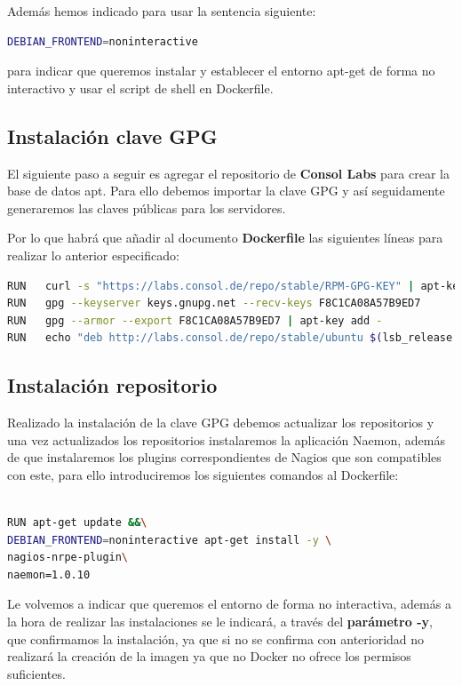 Además hemos indicado para usar la sentencia siguiente:
\begin{lstlisting}[language=bash]
DEBIAN_FRONTEND=noninteractive
\end{lstlisting}
para indicar que queremos instalar y establecer el entorno apt-get de forma no interactivo y usar el script de shell en Dockerfile.
\newpage
\subsection{Instalación clave GPG}
El siguiente paso a seguir es agregar el repositorio de \textbf{Consol Labs} para crear la base de datos apt. Para ello debemos importar la clave GPG y así seguidamente generaremos las claves públicas para los servidores.

Por lo que habrá que añadir al documento \textbf{Dockerfile} las siguientes líneas para realizar lo anterior especificado:

\begin{lstlisting}[language=bash]
RUN   curl -s "https://labs.consol.de/repo/stable/RPM-GPG-KEY" | apt-key add -
RUN   gpg --keyserver keys.gnupg.net --recv-keys F8C1CA08A57B9ED7
RUN   gpg --armor --export F8C1CA08A57B9ED7 | apt-key add -
RUN   echo "deb http://labs.consol.de/repo/stable/ubuntu $(lsb_release -cs) main" > /etc/apt/sources.list.d/labs-consol-stable.list

\end{lstlisting}
\subsection{Instalación repositorio}
Realizado la instalación de la clave GPG debemos actualizar los repositorios y una vez actualizados los repositorios instalaremos la aplicación Naemon, además de que instalaremos los plugins correspondientes de Nagios que son compatibles con este, para ello introduciremos los siguientes comandos al Dockerfile:


\begin{lstlisting}[language=bash]

RUN apt-get update &&\
DEBIAN_FRONTEND=noninteractive apt-get install -y \
nagios-nrpe-plugin\
naemon=1.0.10


\end{lstlisting}

Le volvemos a indicar que queremos el entorno de forma no interactiva, además a la hora de realizar las instalaciones se le indicará, a través del \textbf{parámetro -y}, que confirmamos la instalación, ya que si no se confirma con anterioridad no realizará la creación de la imagen ya que no Docker no ofrece los permisos suficientes.

